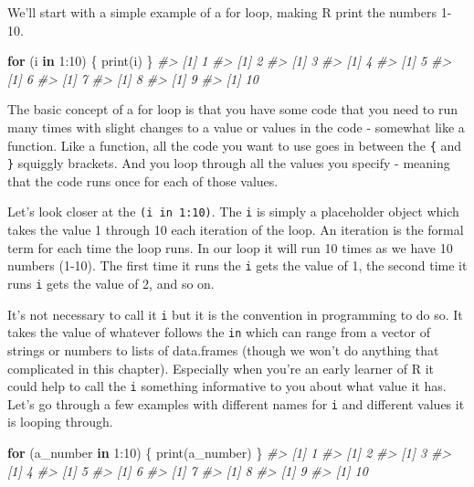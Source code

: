 \documentclass[
]{krantz}
\makeatletter
\newenvironment{Shaded}{\begin{snugshade}}{\end{snugshade}}
\newcommand{\CommentTok}[1]{\textcolor[rgb]{0.37,0.37,0.37}{\textit{#1}}}
\newcommand{\ControlFlowTok}[1]{\textcolor[rgb]{0.27,0.27,0.27}{\textbf{#1}}}
\newcommand{\DecValTok}[1]{\textcolor[rgb]{0.06,0.06,0.06}{#1}}
\newcommand{\FunctionTok}[1]{\textcolor[rgb]{0,0,0}{#1}}
\newcommand{\NormalTok}[1]{#1}
\newcommand{\SpecialCharTok}[1]{\textcolor[rgb]{0,0,0}{#1}}
\newenvironment{kframe}{%
\medskip{}
\setlength{\fboxsep}{.8em}
 \def\at@end@of@kframe{}%
 \ifinner\ifhmode%
  \def\at@end@of@kframe{\end{minipage}}%
  \begin{minipage}{\columnwidth}%
 \fi\fi%
 \def\FrameCommand##1{\hskip\@totalleftmargin \hskip-\fboxsep
 \colorbox{shadecolor}{##1}\hskip-\fboxsep
     \hskip-\linewidth \hskip-\@totalleftmargin \hskip\columnwidth}%
 \MakeFramed {\advance\hsize-\width
   \@totalleftmargin\z@ \linewidth\hsize
   \@setminipage}}%
 {\par\unskip\endMakeFramed%
 \at@end@of@kframe}
\renewenvironment{Shaded}{\begin{kframe}}{\end{kframe}}
\makeatother
\begin{document}
We'll start with a simple example of a for loop, making R
print the numbers 1-10.

\begin{Shaded}
\begin{Highlighting}[]
\ControlFlowTok{for}\NormalTok{ (i }\ControlFlowTok{in} \DecValTok{1}\SpecialCharTok{:}\DecValTok{10}\NormalTok{) \{}
  \FunctionTok{print}\NormalTok{(i)}
\NormalTok{\}}
\CommentTok{\#\textgreater{} [1] 1}
\CommentTok{\#\textgreater{} [1] 2}
\CommentTok{\#\textgreater{} [1] 3}
\CommentTok{\#\textgreater{} [1] 4}
\CommentTok{\#\textgreater{} [1] 5}
\CommentTok{\#\textgreater{} [1] 6}
\CommentTok{\#\textgreater{} [1] 7}
\CommentTok{\#\textgreater{} [1] 8}
\CommentTok{\#\textgreater{} [1] 9}
\CommentTok{\#\textgreater{} [1] 10}
\end{Highlighting}
\end{Shaded}

The basic concept of a for loop is that you have some code
that you need to run many times with slight changes to a
value or values in the code - somewhat like a function. Like
a function, all the code you want to use goes in between the
\texttt{\{} and \texttt{\}} squiggly brackets. And you loop
through all the values you specify - meaning that the code
runs once for each of those values.

Let's look closer at the \texttt{(i\ in\ 1:10)}. The
\texttt{i} is simply a placeholder object which takes the
value 1 through 10 each iteration of the loop. An iteration
is the formal term for each time the loop runs. In our loop
it will run 10 times as we have 10 numbers (1-10). The first
time it runs the \texttt{i} gets the value of 1, the second
time it runs \texttt{i} gets the value of 2, and so on.

It's not necessary to call it \texttt{i} but it is the
convention in programming to do so. It takes the value of
whatever follows the \texttt{in} which can range from a
vector of strings or numbers to lists of data.frames (though
we won't do anything that complicated in this chapter).
Especially when you're an early learner of R it could help
to call the \texttt{i} something informative to you about
what value it has. Let's go through a few examples with
different names for \texttt{i} and different values it is
looping through.

\begin{Shaded}
\begin{Highlighting}[]
\ControlFlowTok{for}\NormalTok{ (a\_number }\ControlFlowTok{in} \DecValTok{1}\SpecialCharTok{:}\DecValTok{10}\NormalTok{) \{}
  \FunctionTok{print}\NormalTok{(a\_number)}
\NormalTok{\}}
\CommentTok{\#\textgreater{} [1] 1}
\CommentTok{\#\textgreater{} [1] 2}
\CommentTok{\#\textgreater{} [1] 3}
\CommentTok{\#\textgreater{} [1] 4}
\CommentTok{\#\textgreater{} [1] 5}
\CommentTok{\#\textgreater{} [1] 6}
\CommentTok{\#\textgreater{} [1] 7}
\CommentTok{\#\textgreater{} [1] 8}
\CommentTok{\#\textgreater{} [1] 9}
\CommentTok{\#\textgreater{} [1] 10}
\end{Highlighting}
\end{Shaded}
\end{document}
